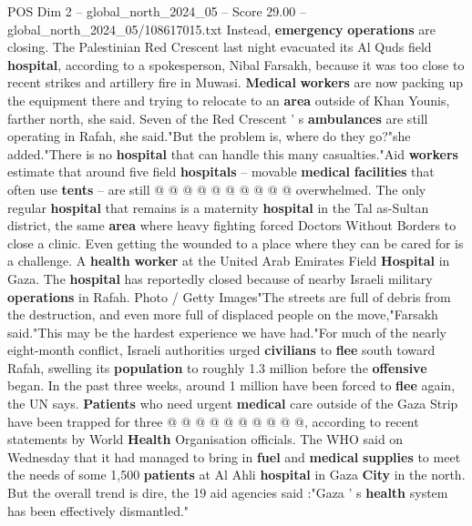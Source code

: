 \begin{textsample}{POS Dim 2 – global\_north\_2024\_05 – Score 29.00 – global\_north\_2024\_05/108617015.txt}
Instead, \textbf{emergency} \textbf{operations} are closing.
The Palestinian Red Crescent last night evacuated its Al Quds field \textbf{hospital}, according to a spokesperson, Nibal Farsakh, because it was too close to recent strikes and artillery fire in Muwasi. \textbf{Medical} \textbf{workers} are now packing up the equipment there and trying to relocate to an \textbf{area} outside of Khan Younis, farther north, she said.
Seven of the Red Crescent ' s \textbf{ambulances} are still operating in Rafah, she said."But the problem is, where do they go?"she added."There is no \textbf{hospital} that can handle this many casualties."Aid \textbf{workers} estimate that around five field \textbf{hospitals} -- movable \textbf{medical} \textbf{facilities} that often use \textbf{tents} -- are still @ @ @ @ @ @ @ @ @ @ overwhelmed.
The only regular \textbf{hospital} that remains is a maternity \textbf{hospital} in the Tal as-Sultan district, the same \textbf{area} where heavy fighting forced Doctors Without Borders to close a clinic.
Even getting the wounded to a place where they can be cared for is a challenge.
A \textbf{health} \textbf{worker} at the United Arab Emirates Field \textbf{Hospital} in Gaza.
The \textbf{hospital} has reportedly closed because of nearby Israeli military \textbf{operations} in Rafah.
Photo / Getty Images"The streets are full of debris from the destruction, and even more full of displaced people on the move,"Farsakh said."This may be the hardest experience we have had."For much of the nearly eight-month conflict, Israeli authorities urged \textbf{civilians} to \textbf{flee} south toward Rafah, swelling its \textbf{population} to roughly 1.3 million before the \textbf{offensive} began.
In the past three weeks, around 1 million have been forced to \textbf{flee} again, the UN says. \textbf{Patients} who need urgent \textbf{medical} care outside of the Gaza Strip have been trapped for three @ @ @ @ @ @ @ @ @ @, according to recent statements by World \textbf{Health} Organisation officials.
The WHO said on Wednesday that it had managed to bring in \textbf{fuel} and \textbf{medical} \textbf{supplies} to meet the needs of some 1,500 \textbf{patients} at Al Ahli \textbf{hospital} in Gaza \textbf{City} in the north.
But the overall trend is dire, the 19 aid agencies said :"Gaza ' s \textbf{health} system has been effectively dismantled."

\end{textsample}
